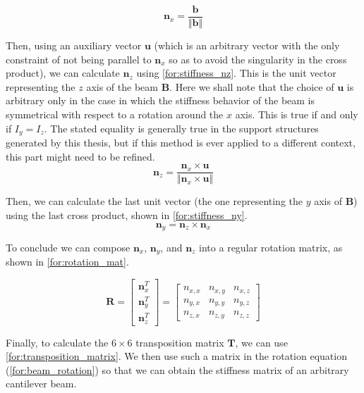\begin{equation}
\mathbf{n}_x = \frac{\mathbf{b}}{\Vert{}\mathbf{b}\Vert{}}
\label{for:stiffness_nx}
\end{equation}

\noindent
Then, using an auxiliary vector $\mathbf{u}$ (which is an arbitrary vector with the only constraint of not being 
parallel to $\mathbf{n}_x$ so as to avoid the singularity in the cross product), we can calculate $\mathbf{n}_z$ using
\cref{for:stiffness_nz}. This is the unit vector representing the $z$ axis of the beam $\mathbf{B}$.
Here we shall note that the choice of $\mathbf{u}$ is arbitrary only in the case in which the stiffness behavior of the
beam is symmetrical with respect to a rotation around the $x$ axis. This is true if and only if $I_y = I_z$. The stated equality 
is generally true in the support structures generated by this thesis, but if this
method is ever applied to a different context, this part might need to be refined.
\begin{equation}
\mathbf{n}_z = \frac{\mathbf{n}_x \times \mathbf{u}}{\Vert{}\mathbf{n}_x \times \mathbf{u}\Vert{}}
\label{for:stiffness_nz}
\end{equation}

\noindent
Then, we can calculate the last unit vector (the one representing the $y$ axis of $\mathbf{B}$) using the last cross product, shown
in \cref{for:stiffness_ny}.
\begin{equation}
\mathbf{n}_y = \mathbf{n}_z \times \mathbf{n}_x
\label{for:stiffness_ny}
\end{equation}

\noindent
To conclude we can compose $\mathbf{n}_x$, $\mathbf{n}_y$, and $\mathbf{n}_z$ into a regular rotation matrix, as shown in
\cref{for:rotation_mat}.

\begin{equation}
\mathbf{R} = \begin{bmatrix} \mathbf{n}_x^T \\ \mathbf{n}_y^T \\ \mathbf{n}_z^T \end{bmatrix} = \begin{bmatrix} n_{x,x} & n_{x,y} & n_{x,z} \\ n_{y,x} & n_{y,y} & n_{y,z} \\ n_{z,x} & n_{z,y} & n_{z,z} \end{bmatrix}
\label{for:rotation_mat}
\end{equation}

\noindent
Finally, to calculate the $6 \times 6$ transposition matrix $\mathbf{T}$, we can use \cref{for:transposition_matrix}.
We then use such a matrix in the rotation equation (\cref{for:beam_rotation}) so that we can obtain the stiffness matrix
of an arbitrary cantilever beam.


